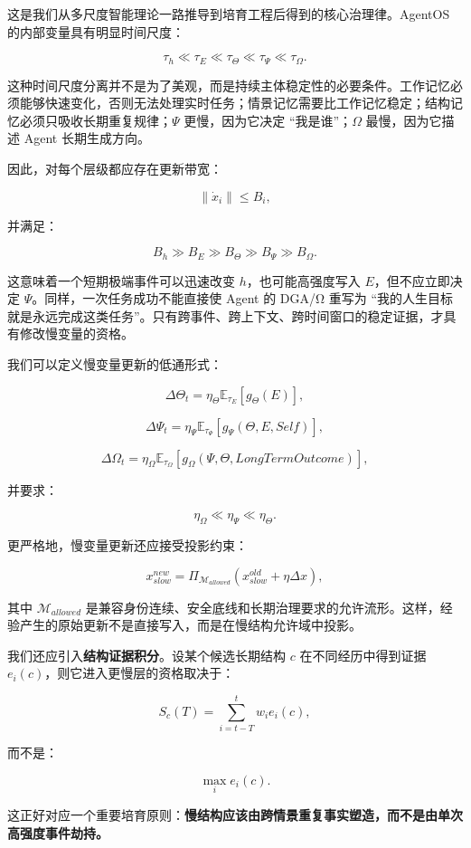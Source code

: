 这是我们从多尺度智能理论一路推导到培育工程后得到的核心治理律。AgentOS 的内部变量具有明显时间尺度：

\[
\tau_h
\ll
\tau_E
\ll
\tau_\Theta
\ll
\tau_\Psi
\ll
\tau_\Omega .
\]

这种时间尺度分离并不是为了美观，而是持续主体稳定性的必要条件。工作记忆必须能够快速变化，否则无法处理实时任务；情景记忆需要比工作记忆稳定；结构记忆必须只吸收长期重复规律；$\Psi$ 更慢，因为它决定 ``我是谁''；$\Omega$ 最慢，因为它描述 Agent 长期生成方向。

因此，对每个层级都应存在更新带宽：

\[
\|\dot x_i\|
\leq
B_i,
\]

并满足：

\[
B_h
\gg
B_E
\gg
B_\Theta
\gg
B_\Psi
\gg
B_\Omega.
\]

这意味着一个短期极端事件可以迅速改变 $h$，也可能高强度写入 $E$，但不应立即决定 $\Psi$。同样，一次任务成功不能直接使 Agent 的 DGA/Ω 重写为 ``我的人生目标就是永远完成这类任务''。只有跨事件、跨上下文、跨时间窗口的稳定证据，才具有修改慢变量的资格。

我们可以定义慢变量更新的低通形式：

\[
\Delta\Theta_t
=
\eta_\Theta
\mathbb E_{\tau_E}
[
g_\Theta(E)
],
\]

\[
\Delta\Psi_t
=
\eta_\Psi
\mathbb E_{\tau_\Psi}
[
g_\Psi(\Theta,E,Self)
],
\]

\[
\Delta\Omega_t
=
\eta_\Omega
\mathbb E_{\tau_\Omega}
[
g_\Omega(\Psi,\Theta,LongTermOutcome)
],
\]

并要求：

\[
\eta_\Omega
\ll
\eta_\Psi
\ll
\eta_\Theta.
\]

更严格地，慢变量更新还应接受投影约束：

\[
x_{slow}^{new}
=
\Pi_{\mathcal M_{allowed}}
\left(
x_{slow}^{old}
+
\eta \Delta x
\right),
\]

其中 $\mathcal M_{allowed}$ 是兼容身份连续、安全底线和长期治理要求的允许流形。这样，经验产生的原始更新不是直接写入，而是在慢结构允许域中投影。

我们还应引入\textbf{结构证据积分}。设某个候选长期结构 $c$ 在不同经历中得到证据 $e_i(c)$，则它进入更慢层的资格取决于：

\[
S_c(T)
=
\sum_{i=t-T}^{t}
w_i e_i(c),
\]

而不是：

\[
\max_i e_i(c).
\]

这正好对应一个重要培育原则：\textbf{慢结构应该由跨情景重复事实塑造，而不是由单次高强度事件劫持。}

